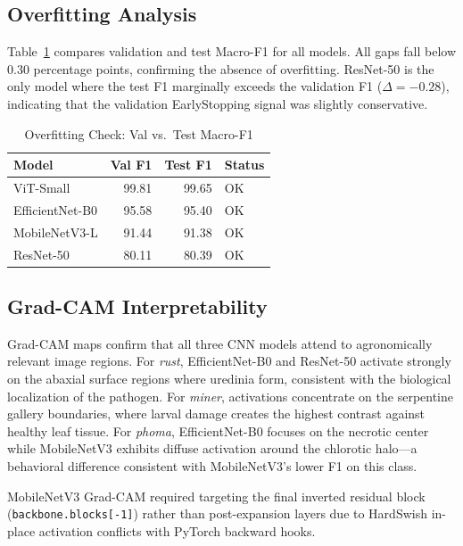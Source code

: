 \documentclass[conference]{IEEEtran}
\begin{document}
\subsection{Overfitting Analysis}

Table~\ref{tab:overfitting} compares validation and test Macro-F1 for all
models. All gaps fall below 0.30 percentage points, confirming the absence
of overfitting. ResNet-50 is the only model where the test F1 marginally
exceeds the validation F1 ($\Delta = -0.28$), indicating that the
validation EarlyStopping signal was slightly conservative.

\begin{table}[htbp]
  \centering
  \caption{Overfitting Check: Val vs.\ Test Macro-F1}
  \label{tab:overfitting}
  \begin{tabular}{lrrl}
    \toprule
    \textbf{Model} & \textbf{Val F1} & \textbf{Test F1} & \textbf{Status} \\
    \midrule
    ViT-Small       & 99.81 & 99.65 & \textcolor{green!50!black}{OK} \\
    EfficientNet-B0 & 95.58 & 95.40 & \textcolor{green!50!black}{OK} \\
    MobileNetV3-L   & 91.44 & 91.38 & \textcolor{green!50!black}{OK} \\
    ResNet-50       & 80.11 & 80.39 & \textcolor{green!50!black}{OK} \\
    \bottomrule
  \end{tabular}
\end{table}

\subsection{Grad-CAM Interpretability}

Grad-CAM maps confirm that all three CNN models attend to agronomically
relevant image regions. For \textit{rust}, EfficientNet-B0 and ResNet-50
activate strongly on the abaxial surface regions where uredinia form,
consistent with the biological localization of the pathogen. For
\textit{miner}, activations concentrate on the serpentine gallery
boundaries, where larval damage creates the highest contrast against
healthy leaf tissue. For \textit{phoma}, EfficientNet-B0 focuses on the
necrotic center while MobileNetV3 exhibits diffuse activation around the
chlorotic halo—a behavioral difference consistent with MobileNetV3's
lower F1 on this class.

MobileNetV3 Grad-CAM required targeting the final inverted residual block
(\texttt{backbone.blocks[-1]}) rather than post-expansion layers due to
HardSwish in-place activation conflicts with PyTorch backward hooks.
\end{document}
